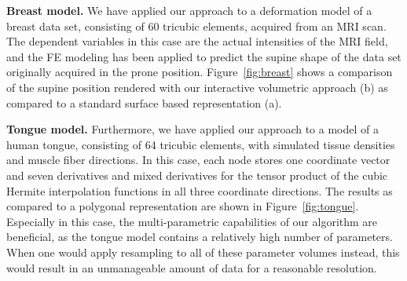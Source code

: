 \documentclass[journal]{vgtc}                %
\begin{document}
\noindent \textbf{Breast model.} We have applied our approach to a deformation model of a breast data set, consisting of 60 tricubic elements, acquired from an MRI scan. The dependent variables in this case are the actual intensities of the MRI field, and the FE modeling has been applied to predict the supine shape of the data set originally acquired in the prone position. Figure~\ref{fig:breast} shows a comparison of the supine position rendered with our interactive volumetric approach (b) as compared to a standard surface based representation (a).

\noindent \textbf{Tongue model.} Furthermore, we have applied our approach to a model of a human tongue, consisting of 64 tricubic elements, with simulated tissue densities and muscle fiber directions. In this case, each node stores one coordinate vector and seven derivatives and mixed derivatives for the tensor product of the cubic Hermite interpolation functions in all three coordinate directions. The results as compared to a polygonal representation are shown in Figure~\ref{fig:tongue}. Especially in this case, the multi-parametric capabilities of our algorithm are beneficial, as the tongue model contains a relatively high number of parameters. When one would apply resampling to all of these parameter volumes instead, this would result in an unmanageable amount of data for a reasonable resolution.
\end{document}
